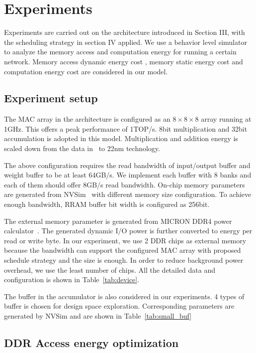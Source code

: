 \section{Experiments}



Experiments are carried out on the architecture introduced in Section III, with the scheduling strategy in section IV applied. We use a behavior level simulator to analyze the memory access and computation energy for running a certain network. Memory access dynamic energy cost , memory static energy cost and computation energy cost are considered in our model.

\subsection{Experiment setup}
The MAC array in the architecture is configured as an $8\times8\times8$ array running at 1GHz. This offers a peak performance of 1TOP/s. 8bit multiplication and 32bit accumulation is adopted in this model. Multiplication and addition energy is scaled down from the data in~\cite{mac_energy} to 22nm technology. 

The above configuration requires the read bandwidth of input/output buffer and weight buffer to be at least 64GB/s. We implement each buffer with 8 banks and each of them should offer 8GB/s read bandwidth. On-chip memory parameters are generated from NVSim~\cite{dong2014nvsim} with different memory size configuration. To achieve enough bandwidth, RRAM buffer bit width is configured as 256bit. 

The external memory parameter is generated from MICRON DDR4 power calculator~\cite{powercalc}. The generated dynamic I/O power is further converted to energy per read or write byte. In our experiment, we use 2 DDR chips as external memory because the bandwidth can support the configured MAC array with proposed schedule strategy and the size is enough. In order to reduce background power overhead, we use the least number of chips. All the detailed data and configuration is shown in Table~\ref{tab:device}. 

The buffer in the accumulator is also considered in our experiments. 4 types of buffer is chosen for design space exploration. Corresponding parameters are generated by NVSim and are shown in Table~\ref{tab:small_buf}



\subsection{DDR Access energy optimization}

